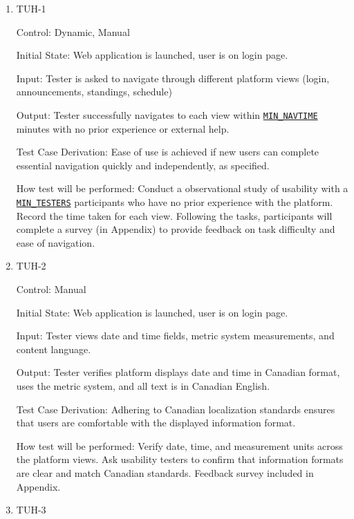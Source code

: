 \documentclass[12pt, titlepage]{article}
\begin{document}
\begin{enumerate}

  \item{TUH-1\\}

        Control: Dynamic, Manual

        Initial State:  Web application is launched, user is on login page.

        Input: Tester is asked to navigate through different platform views (login, announcements, standings, schedule)

        Output: Tester successfully navigates to each view within \hyperref[MIN_NAVTIME]{\texttt{MIN\_NAVTIME}} minutes with no prior experience or external help.

        Test Case Derivation: Ease of use is achieved if new users can complete essential navigation quickly and independently, as specified.

        How test will be performed: Conduct a observational study of usability with a \hyperref[MIN_TESTERS]{\texttt{MIN\_TESTERS}} participants who have no prior experience with the platform. Record the time taken for each view. Following the tasks, participants will complete a survey (in Appendix) to provide feedback on task difficulty and ease of navigation.

  \item{TUH-2\\}

        Control: Manual

        Initial State:  Web application is launched, user is on login page.

        Input: Tester views date and time fields, metric system measurements, and content language.

        Output: Tester verifies platform displays date and time in Canadian format, uses the metric system, and all text is in Canadian English.

        Test Case Derivation: Adhering to Canadian localization standards ensures that users are comfortable with the displayed information format.

        How test will be performed: Verify date, time, and measurement units across the platform views. Ask usability testers to confirm that information formats are clear and match Canadian standards. Feedback survey included in Appendix.

  \item{TUH-3\\}


\end{enumerate}
\end{document}
